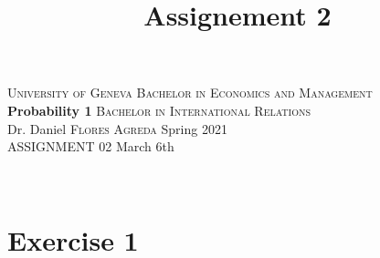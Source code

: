 \documentclass[12pt,thmsa]{article}\usepackage[]{graphicx}\usepackage[]{color}
\title{Assignement 2}
\begin{document}
\noindent \textsc{University of Geneva}     \hfill \textsc{Bachelor in Economics and Management} \\
\textbf{Probability 1}                      \hfill \textsc{Bachelor in International Relations} \\
Dr. Daniel \textsc{Flores Agreda}                 \hfill Spring 2021  \\
ASSIGNMENT 02                               \hfill   March 6th



\noindent
\makebox[\linewidth]{\rule{\textwidth}{0.4pt}}\\[1.5ex]

\section*{Exercise 1}
\end{document}
